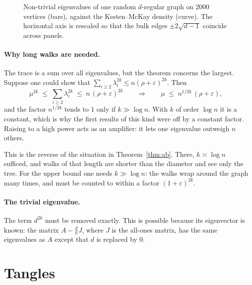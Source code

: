 \documentclass[11pt,letterpaper]{article}
\theoremstyle{definition}
\theoremstyle{remark}
\newcommand{\edge}{2\sqrt{d-1}}
\newcommand{\eps}{\varepsilon}
\begin{document}
\begin{figure}[ht]
  \centering
  
  \caption{Non-trivial eigenvalues of one random $d$-regular graph on $2000$ vertices (bars),
  against the Kesten--McKay density (curve). The horizontal axis is rescaled so that the bulk
  edges $\pm\edge$ coincide across panels.}
  \label{fig:spectrum}
\end{figure}

\paragraph{Why long walks are needed.}
The trace is a sum over all eigenvalues, but the theorem concerns the largest. Suppose one could
show that $\sum_{i\ge2}\lambda_i^{2k}\le n(\rho+\eps)^{2k}$. Then
\begin{equation}\label{eq:amplifier}
  \mu^{2k}\;\le\;\sum_{i\ge 2}\lambda_i^{2k}\;\le\;n\,(\rho+\eps)^{2k}
  \qquad\Longrightarrow\qquad
  \mu\;\le\;n^{1/2k}\,(\rho+\eps),
\end{equation}
and the factor $n^{1/2k}$ tends to $1$ only if $k\gg\log n$. With $k$ of order $\log n$ it is a
constant, which is why the first results of this kind were off by a constant factor. Raising to
a high power acts as an amplifier: it lets one eigenvalue outweigh $n$ others.

This is the reverse of the situation in Theorem~\ref{thm:ab}. There, $k\asymp\log n$ sufficed,
and walks of that length are shorter than the diameter and see only the tree. For the upper bound
one needs $k\gg\log n$: the walks wrap around the graph many times, and must be counted to within
a factor $(1+\eps)^{2k}$.

\paragraph{The trivial eigenvalue.}
The term $d^{2k}$ must be removed exactly. This is possible because its eigenvector is known: the
matrix $A-\tfrac dn J$, where $J$ is the all-ones matrix, has the same eigenvalues as $A$ except
that $d$ is replaced by $0$.

\section{Tangles}
\end{document}
